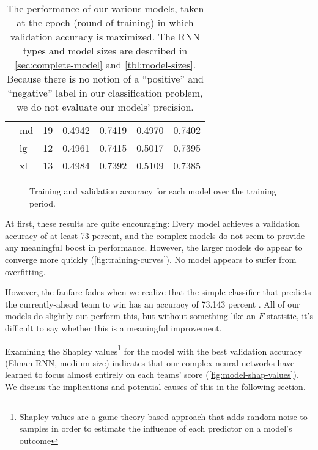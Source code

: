 \begin{table}
\begin{tabular}{r l  ccccc}
		         & md   & 19    & 0.4942                                   & 0.7419                                     & 0.4970 & 0.7402   \\
		         & lg   & 12    & 0.4961                                   & 0.7415                                     & 0.5017 & 0.7395   \\
		         & xl   & 13    & 0.4984                                   & 0.7392                                     & 0.5109 & 0.7385   \\
		\hline
	\end{tabular}
	\caption{The performance of our various models, taken at the epoch (round of training) in which validation accuracy is maximized. The RNN types and model sizes are described in \autoref{sec:complete-model} and \autoref{tbl:model-sizes}. Because there is no notion of a ``positive'' and ``negative'' label in our classification problem, we do not evaluate our models' precision.}
	\label{tbl:model-results}
\end{table}

\begin{figure}
	\centering
	
	\caption{Training and validation accuracy for each model over the training period.}
	\label{fig:training-curves}
\end{figure}

At first, these results are quite encouraging: Every model achieves a validation accuracy of at least 73 percent, and the complex models do not seem to provide any meaningful boost in performance. However, the larger models do appear to converge more quickly (\autoref{fig:training-curves}). No model appears to suffer from overfitting.

However, the fanfare fades when we realize that the simple classifier that predicts the currently-ahead team to win has an accuracy of 73.143 percent \cite{stat-comps-github}. All of our models do slightly out-perform this, but without something like an $F$-statistic, it's difficult to say whether this is a meaningful improvement.

Examining the Shapley values\footnote{Shapley values are a game-theory based approach that adds random noise to samples in order to estimate the influence of each predictor on a model's outcome} \cite{captum, shap-paper} for the model with the best validation accuracy (Elman RNN, medium size) indicates that our complex neural networks have learned to focus almost entirely on each teams' score (\autoref{fig:model-shap-values}).
We discuss the implications and potential causes of this in the following section.

